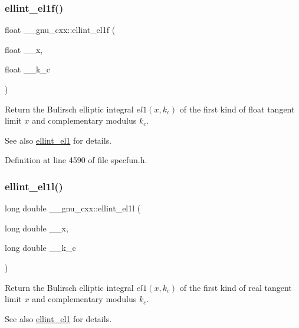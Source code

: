 \subsubsection{\texorpdfstring{ellint\+\_\+el1f()}{ellint\_el1f()}}
{\footnotesize\ttfamily float \+\_\+\+\_\+gnu\+\_\+cxx\+::ellint\+\_\+el1f (\begin{DoxyParamCaption}\item[{float}]{\+\_\+\+\_\+x,  }\item[{float}]{\+\_\+\+\_\+k\+\_\+c }\end{DoxyParamCaption})\hspace{0.3cm}{\ttfamily [inline]}}

Return the Bulirsch elliptic integral $ el1(x,k_c) $ of the first kind of {\ttfamily float} tangent limit $ x $ and complementary modulus $ k_c $.

\begin{DoxySeeAlso}{See also}
\hyperlink{group__gnu__math__spec__func_ga510b1e51e7d3bc937ed1b4c2f57492e4}{ellint\+\_\+el1} for details. 
\end{DoxySeeAlso}


Definition at line 4590 of file specfun.\+h.

\mbox{\label{group__gnu__math__spec__func_gaeed1201e421be410460739048cba5cd8}} 
\subsubsection{\texorpdfstring{ellint\+\_\+el1l()}{ellint\_el1l()}}
{\footnotesize\ttfamily long double \+\_\+\+\_\+gnu\+\_\+cxx\+::ellint\+\_\+el1l (\begin{DoxyParamCaption}\item[{long double}]{\+\_\+\+\_\+x,  }\item[{long double}]{\+\_\+\+\_\+k\+\_\+c }\end{DoxyParamCaption})\hspace{0.3cm}{\ttfamily [inline]}}

Return the Bulirsch elliptic integral $ el1(x,k_c) $ of the first kind of real tangent limit $ x $ and complementary modulus $ k_c $.

\begin{DoxySeeAlso}{See also}
\hyperlink{group__gnu__math__spec__func_ga510b1e51e7d3bc937ed1b4c2f57492e4}{ellint\+\_\+el1} for details. 
\end{DoxySeeAlso}


